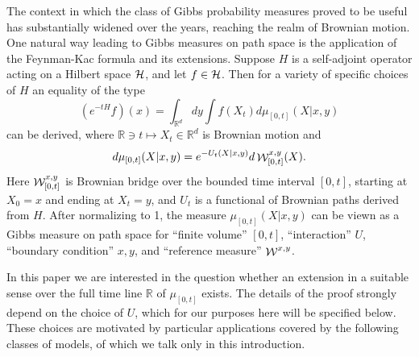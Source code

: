 \documentclass[a4paper,11pt]{article}
\newcommand{\R}{\mathbb{R}}
\newcommand{\W}{\mathop{\mathrm{{\cal W}}}\nolimits}
\begin{document}
The context in which the class of Gibbs probability measures proved 
to be useful has substantially widened over the years, reaching the 
realm of Brownian motion. 
One natural way leading to Gibbs measures on path space is the 
application of the Feynman-Kac formula and its extensions. Suppose 
$H$ is a self-adjoint operator acting on a Hilbert space $\cal H$, and 
let $f \in {\cal H}$. Then for a variety of specific choices of $H$ 
an equality of the type 
\begin{equation}
(e^{-tH}f)(x) = \int_{\R^d} dy \int f(X_t) d\mu_{[0,t]}(X|x,y)
\label{fk}
\end{equation}
can be derived, where $\R \ni t\mapsto X_t \in \R^d$ is Brownian 
motion and
\begin{equation}
d\mu_{[0,t]}(X|x,y) = e^{-U_t(X|x,y)} d\W^{x,y}_{[0,t]}(X).
\label{gibb}
\end{equation}
Here $\W^{x,y}_{[0,t]}$ is Brownian bridge over the bounded time 
interval $[0,t]$, starting at $X_0 = x$ and ending at $X_t = y$, and 
$U_t$ is a functional of Brownian paths derived from $H$. After 
normalizing to 1, the measure $\mu_{[0,t]}(X|x,y)$ can be viewn as a 
Gibbs measure on path space for ``finite volume'' $[0,t]$,  
``interaction'' $U$, ``boundary condition'' $x,y$, and ``reference 
measure'' $\W^{x,y}$.  

In this paper we are interested in the question whether an extension 
in a suitable sense over the full time line $\R$ of $\mu_{[0,t]}$ 
exists. The details of the proof strongly depend on the choice of $U$, 
which for our purposes here will be specified below. These choices are 
motivated by particular applications covered by the following classes
of models, of which we talk only in this introduction. 
\end{document}
